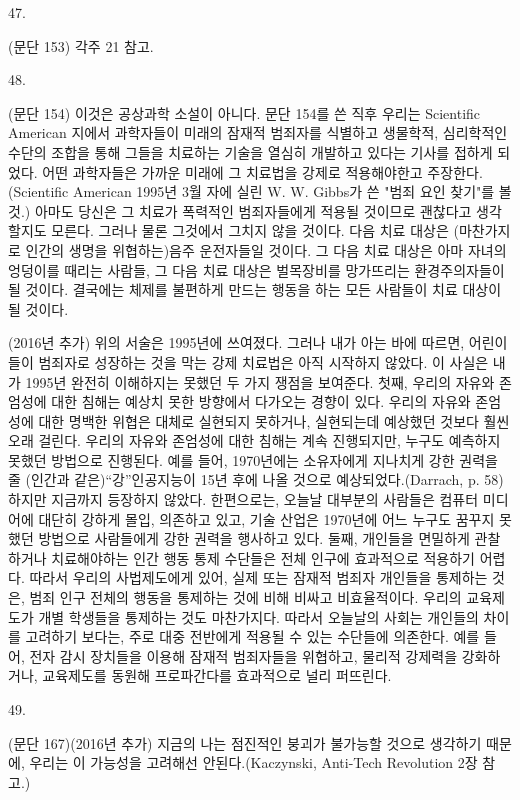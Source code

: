 \documentclass[11pt,a4paper]{article}
\begin{document}
\begin{multicols}{2}
\hypertarget{47}{47.} (문단 153) 각주 21 참고. 


\hypertarget{48}{48.} (문단 154) 이것은 공상과학 소설이 아니다. 문단 154를 쓴 직후 우리는 \textlangle{}Scientific American\textrangle{} 지에서 과학자들이 미래의 잠재적 범죄자를 식별하고 생물학적, 심리학적인 수단의 조합을 통해 그들을  치료하는 기술을 열심히 개발하고 있다는 기사를 접하게 되었다. 어떤 과학자들은 가까운 미래에 그  치료법을 강제로 적용해야한고 주장한다. (Scientific American 1995년 3월 자에 실린 W. W. Gibbs가  쓴 "범죄 요인 찾기"를 볼 것.) 아마도 당신은 그 치료가 폭력적인 범죄자들에게 적용될 것이므로  괜찮다고 생각할지도 모른다. 그러나 물론 그것에서 그치지 않을 것이다. 다음 치료 대상은 (마찬가지로  인간의 생명을 위협하는)음주 운전자들일 것이다. 그 다음 치료 대상은 아마 자녀의 엉덩이를 때리는  사람들, 그 다음 치료 대상은 벌목장비를 망가뜨리는 환경주의자들이 될 것이다. 결국에는 체제를  불편하게 만드는 행동을 하는 모든 사람들이 치료 대상이 될 것이다. 


(2016년 추가) 위의 서술은 1995년에 쓰여졌다. 그러나 내가 아는 바에 따르면, 어린이들이 범죄자로  성장하는 것을 막는 강제 치료법은 아직 시작하지 않았다. 이 사실은 내가 1995년 완전히 이해하지는  못했던 두 가지 쟁점을 보여준다. 
첫째, 우리의 자유와 존엄성에 대한 침해는 예상치 못한 방향에서 다가오는 경향이 있다. 우리의 자유와  존엄성에 대한 명백한 위협은 대체로 실현되지 못하거나, 실현되는데 예상했던 것보다 훨씬 오래 걸린다.  우리의 자유와 존엄성에 대한 침해는 계속 진행되지만, 누구도 예측하지 못했던 방법으로 진행된다. 예를  
들어, 1970년에는 소유자에게 지나치게 강한 권력을 줄 (인간과 같은)“강”인공지능이 15년 후에 나올 것으로 예상되었다.(Darrach, p. 58) 하지만 지금까지 등장하지 않았다. 한편으로는, 오늘날 대부분의  사람들은 컴퓨터 미디어에 대단히 강하게 몰입, 의존하고 있고, 기술 산업은 1970년에 어느 누구도  꿈꾸지 못했던 방법으로 사람들에게 강한 권력을 행사하고 있다. 
둘째, 개인들을 면밀하게 관찰하거나 치료해야하는 인간 행동 통제 수단들은 전체 인구에 효과적으로  적용하기 어렵다. 따라서 우리의 사법제도에게 있어, 실제 또는 잠재적 범죄자 개인들을 통제하는 것은,  범죄 인구 전체의 행동을 통제하는 것에 비해 비싸고 비효율적이다. 우리의 교육제도가 개별 학생들을  통제하는 것도 마찬가지다. 따라서 오늘날의 사회는 개인들의 차이를 고려하기 보다는, 주로 대중 전반에게 적용될 수 있는 수단들에 의존한다. 예를 들어, 전자 감시 장치들을 이용해 잠재적 범죄자들을  위협하고, 물리적 강제력을 강화하거나, 교육제도를 동원해 프로파간다를 효과적으로 널리 퍼뜨린다.


\hypertarget{49}{49.} (문단 167)(2016년 추가) 지금의 나는 점진적인 붕괴가 불가능할 것으로 생각하기 때문에, 우리는  이 가능성을 고려해선 안된다.(Kaczynski, Anti-Tech Revolution 2장 참고.) 



\end{multicols}
\end{document}
